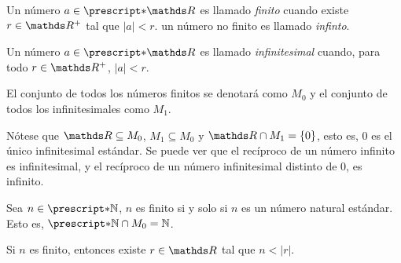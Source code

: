 \begin{definition}
  Un número $a\in\st{\R}$ es llamado \emph{finito} cuando existe
  $r\in\R^+$ tal que $|a| < r$. un número no finito es llamado
  \emph{infinto}.

  Un número $a\in\st{\R}$ es llamado \emph{infinitesimal} cuando, para
  todo $r\in\R^+$, $|a|<r$.

  El conjunto de todos los números finitos se denotará como $M_0$ y el
  conjunto de todos los infinitesimales como $M_1$.
\end{definition}

Nótese que $\R\subseteq M_0$, $M_1\subseteq M_0$ y $\R \cap M_1 = \{0\}$,
esto es, $0$ es el único infinitesimal estándar. Se puede ver que el
recíproco de un número infinito es infinitesimal, y el recíproco de
un número infinitesimal distinto de $0$, es infinito.

\begin{theorem}
  Sea $n\in\st{\N}$, $n$ es finito si y solo si $n$ es un número natural
  estándar. Esto es, $\st{\N} \cap M_0 = \N$.
\end{theorem}

\begin{demo}
  Si $n$ es finito, entonces existe $r\in\R$ tal que $n< |r|$.
\end{demo}
